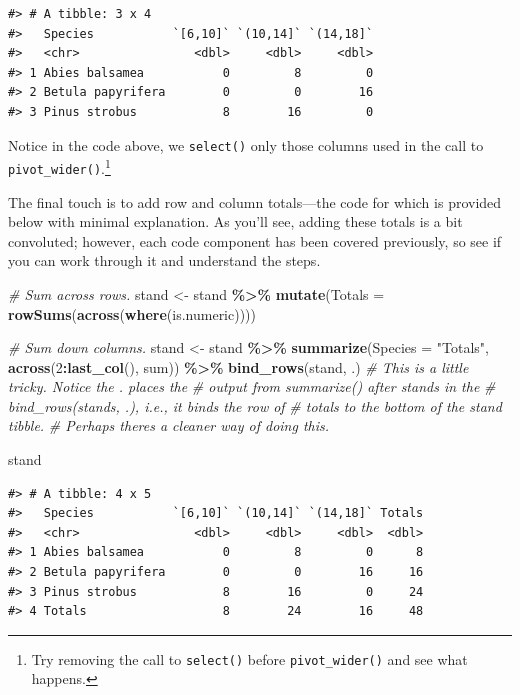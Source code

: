 \documentclass[
  11pt,
]{krantz}
\newenvironment{Shaded}{\begin{snugshade}}{\end{snugshade}}
\newcommand{\CommentTok}[1]{\textcolor[rgb]{0.56,0.35,0.01}{\textit{#1}}}
\newcommand{\DataTypeTok}[1]{\textcolor[rgb]{0.13,0.29,0.53}{#1}}
\newcommand{\DecValTok}[1]{\textcolor[rgb]{0.00,0.00,0.81}{#1}}
\newcommand{\KeywordTok}[1]{\textcolor[rgb]{0.13,0.29,0.53}{\textbf{#1}}}
\newcommand{\NormalTok}[1]{#1}
\newcommand{\OperatorTok}[1]{\textcolor[rgb]{0.81,0.36,0.00}{\textbf{#1}}}
\newcommand{\StringTok}[1]{\textcolor[rgb]{0.31,0.60,0.02}{#1}}
\theoremstyle{definition}
\theoremstyle{definition}
\theoremstyle{definition}
\theoremstyle{definition}
\theoremstyle{remark}
\begin{document}
\begin{verbatim}
#> # A tibble: 3 x 4
#>   Species           `[6,10]` `(10,14]` `(14,18]`
#>   <chr>                <dbl>     <dbl>     <dbl>
#> 1 Abies balsamea           0         8         0
#> 2 Betula papyrifera        0         0        16
#> 3 Pinus strobus            8        16         0
\end{verbatim}

Notice in the code above, we \texttt{select()} only those columns used in the call to \texttt{pivot\_wider()}.\footnote{Try removing the call to \texttt{select()} before \texttt{pivot\_wider()} and see what happens.}

The final touch is to add row and column totals---the code for which is provided below with minimal explanation. As you'll see, adding these totals is a bit convoluted; however, each code component has been covered previously, so see if you can work through it and understand the steps.

\begin{Shaded}
\begin{Highlighting}[]
\CommentTok{\# Sum across rows.}
\NormalTok{stand \textless{}{-}}\StringTok{ }\NormalTok{stand }\OperatorTok{\%\textgreater{}\%}
\StringTok{  }\KeywordTok{mutate}\NormalTok{(}\DataTypeTok{Totals =} \KeywordTok{rowSums}\NormalTok{(}\KeywordTok{across}\NormalTok{(}\KeywordTok{where}\NormalTok{(is.numeric))))}

\CommentTok{\# Sum down columns.  }
\NormalTok{stand \textless{}{-}}\StringTok{ }\NormalTok{stand }\OperatorTok{\%\textgreater{}\%}\StringTok{  }
\StringTok{  }\KeywordTok{summarize}\NormalTok{(}\DataTypeTok{Species =} \StringTok{"Totals"}\NormalTok{, }\KeywordTok{across}\NormalTok{(}\DecValTok{2}\OperatorTok{:}\KeywordTok{last\_col}\NormalTok{(), sum)) }\OperatorTok{\%\textgreater{}\%}
\StringTok{  }\KeywordTok{bind\_rows}\NormalTok{(stand, .) }\CommentTok{\# This is a little tricky. Notice the . places the}
                      \CommentTok{\# output from summarize() after stands in the}
                      \CommentTok{\# bind\_rows(stands, .), i.e., it binds the row of}
                      \CommentTok{\# totals to the bottom of the stand tibble.}
                      \CommentTok{\# Perhaps there\textquotesingle{}s a cleaner way of doing this.}
         
\NormalTok{stand}
\end{Highlighting}
\end{Shaded}

\begin{verbatim}
#> # A tibble: 4 x 5
#>   Species           `[6,10]` `(10,14]` `(14,18]` Totals
#>   <chr>                <dbl>     <dbl>     <dbl>  <dbl>
#> 1 Abies balsamea           0         8         0      8
#> 2 Betula papyrifera        0         0        16     16
#> 3 Pinus strobus            8        16         0     24
#> 4 Totals                   8        24        16     48
\end{verbatim}
\end{document}
